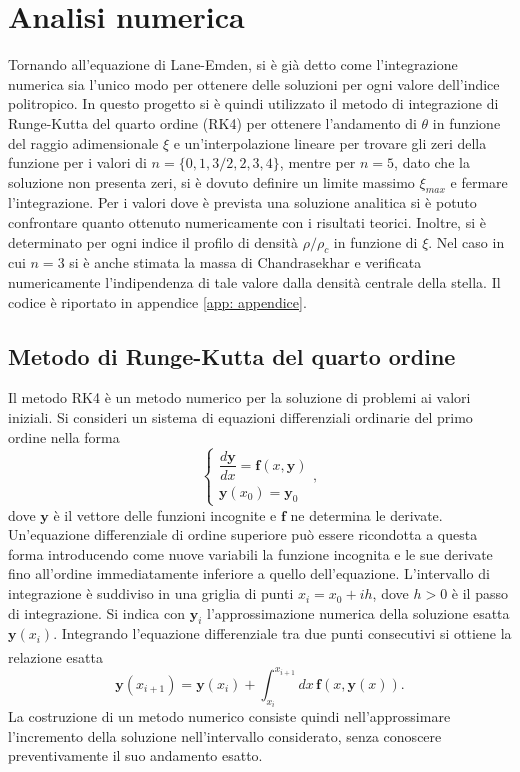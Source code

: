 \documentclass{article}
\newcommand{\supcite}[2][]{\textsuperscript{\cite[#1]{#2}}}
\numberwithin{equation}{section}
\begin{document}
\section{Analisi numerica}
Tornando all'equazione di Lane-Emden, si è già detto come l'integrazione numerica sia l'unico modo per ottenere delle soluzioni per ogni valore dell'indice politropico. In questo progetto si è quindi utilizzato il metodo di integrazione di Runge-Kutta del quarto ordine (RK4) per ottenere l'andamento di $\theta$ in funzione del raggio adimensionale $\xi$ e un'interpolazione lineare per trovare gli zeri della funzione per i valori di $n = \{0,1,3/2,2,3,4\}$, mentre per $n = 5$, dato che la soluzione non presenta zeri, si è dovuto definire un limite massimo $\xi_{max}$ e fermare l'integrazione. Per i valori dove è prevista una soluzione analitica si è potuto confrontare quanto ottenuto numericamente con i risultati teorici. Inoltre, si è determinato per ogni indice il profilo di densità $\rho/\rho_c$ in funzione di $\xi$. Nel caso in cui $n = 3$ si è anche stimata la massa di Chandrasekhar e verificata numericamente l'indipendenza di tale valore dalla densità centrale della stella. Il codice è riportato in appendice \ref{app: appendice}. 

\subsection{Metodo di Runge-Kutta del quarto ordine}

Il metodo RK4 è un metodo numerico per la soluzione di problemi ai valori iniziali. Si consideri un sistema di equazioni differenziali ordinarie del primo ordine nella forma
\begin{equation}
\label{eq: problema di Cauchy}
    \begin{cases}
        \dfrac{d\bm{y}}{dx} = \bm{f}(x,\bm{y}) \\[2ex]
        \bm{y}(x_0) = \bm{y}_0
    \end{cases},
\end{equation}
dove $\bm{y}$ è il vettore delle funzioni incognite e $\bm{f}$ ne determina le derivate. Un'equazione differenziale di ordine superiore può essere ricondotta a questa forma introducendo come nuove variabili la funzione incognita e le sue derivate fino all'ordine immediatamente inferiore a quello dell'equazione. L'intervallo di integrazione è suddiviso in una griglia di punti $x_i = x_0 + ih$, dove $h > 0$ è il passo di integrazione. Si indica con $\bm{y}_i$ l'approssimazione numerica della soluzione esatta $\bm{y}(x_i)$. Integrando l'equazione differenziale tra due punti consecutivi si ottiene la relazione esatta\supcite[pg.~132]{hairer1993}
\begin{equation}
\label{eq: forma integrale problema di Cauchy}
    \bm{y}(x_{i+1}) = \bm{y}(x_i)
    + \int_{x_i}^{x_{i+1}}dx\, \bm{f}(x,\bm{y}(x)).
\end{equation}
La costruzione di un metodo numerico consiste quindi nell'approssimare l'incremento della soluzione nell'intervallo considerato, senza conoscere preventivamente il suo andamento esatto.
\end{document}
